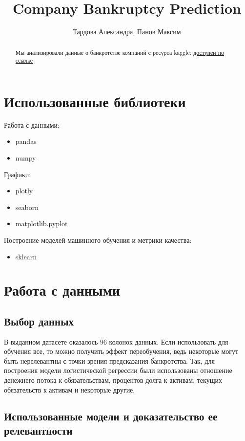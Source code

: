 \documentclass{article}
\title{Company Bankruptcy Prediction}
\author{Тардова Александра, Панов Максим}
\begin{document}
\maketitle

\begin{abstract}
Мы анализировали данные о банкротстве компаний с ресурса kaggle: \href{https://www.kaggle.com/datasets/fedesoriano/company-bankruptcy-prediction/}{доступен по ссылке}
\end{abstract}

\section{Использованные библиотеки}
Работа с данными:
\begin{itemize}
\item pandas 
\item numpy
\end{itemize}
Графики:
\begin{itemize}
\item plotly
\item seaborn
\item matplotlib.pyplot
\end{itemize}
Построение моделей машинного обучения и метрики качества:
\begin{itemize}
\item sklearn
\end{itemize}


\section{Работа с данными }

\subsection{Выбор данных}

В выданном датасете оказалось 96 колонок данных. Если использовать для обучения все, то можно получить эффект переобучения, ведь некоторые могут быть нерелевантны с точки зрения предсказания банкротства. Так, для построения модели логистической регрессии были использованы отношение денежнего потока к обязательствам, процентов долга к активам, текущих обязательств к активам и некоторые другие.

\subsection{Использованные модели и доказательство ее релевантности}
\end{document}
